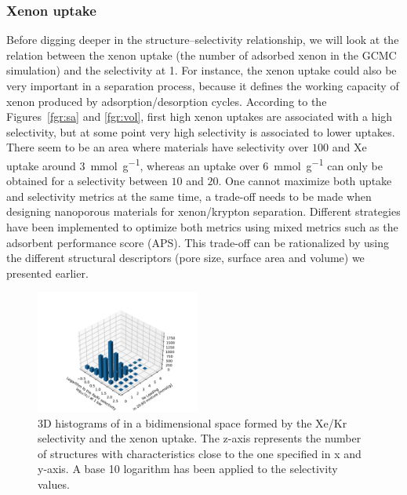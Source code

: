 \documentclass[main.tex]{subfiles}
\begin{document}
\subsubsection{Xenon uptake}

Before digging deeper in the structure--selectivity relationship, we will look at the relation between the xenon uptake (the number of adsorbed xenon in the GCMC simulation) and the selectivity at \SI{1}{\atm}. For instance, the xenon uptake could also be very important in a separation process, because it defines the working capacity of xenon produced by adsorption/desorption cycles. According to the Figures~\ref{fgr:sa} and \ref{fgr:vol}, first high xenon uptakes are associated with a high selectivity, but at some point very high selectivity is associated to lower uptakes. There seem to be an area where materials have selectivity over $100$ and Xe uptake around \SI{3}{\milli\mole\per\gram}, whereas an uptake over \SI{6}{\milli\mole\per\gram} can only be obtained for a selectivity between $10$ and $20$. One cannot maximize both uptake and selectivity metrics at the same time, a trade-off needs to be made when designing nanoporous materials for xenon/krypton separation.\cite{Zhang_2022} Different strategies have been implemented to optimize both metrics using mixed metrics such as the adsorbent performance score (APS).\cite{Solanki_2020}
This trade-off can be rationalized by using the different structural descriptors (pore size, surface area and volume) we presented earlier. 

\begin{figure}[h]
  \centering
  \includegraphics[width=0.48\textwidth]{figures/2-thermo/3D_hist_selec_uptake.pdf}
  \caption{3D histograms of in a bidimensional space formed by the Xe/Kr selectivity and the xenon uptake. The z-axis represents the number of structures with characteristics close to the one specified in x and y-axis. A base 10 logarithm has been applied to the selectivity values.}\label{fgr:3D_uptake}
\end{figure}
\end{document}

